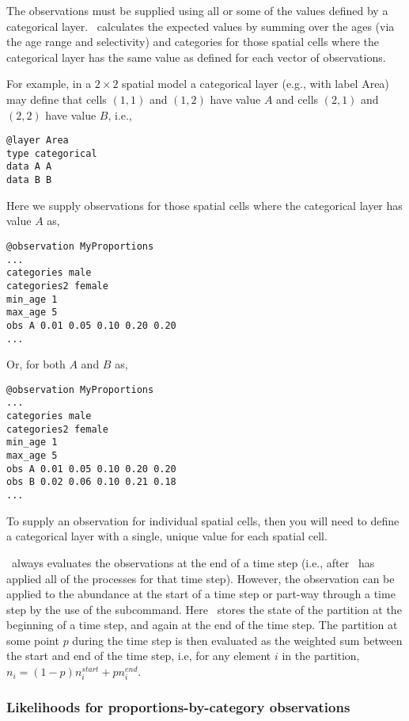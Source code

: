 The observations must be supplied using all or some of the values defined by a categorical layer. \SPM\ calculates the expected values by summing over the ages (via the age range and selectivity) and categories for those spatial cells where the categorical layer has the same value as defined for each vector of observations.

For example, in a $2 \times 2$ spatial model a categorical layer (e.g., with label Area) may define that cells $(1,1)$ and $(1,2)$ have value $A$ and cells $(2,1)$ and $(2,2)$ have value $B$, i.e.,

\begin{verbatim}
@layer Area
type categorical
data A A 
data B B
\end{verbatim}

Here we supply observations for those spatial cells where the categorical layer has value $A$ as, 

\begin{verbatim}
@observation MyProportions
...
categories male 
categories2 female
min_age 1
max_age 5
obs A 0.01 0.05 0.10 0.20 0.20
...
\end{verbatim}

Or, for both $A$ and $B$ as,

\begin{verbatim}
@observation MyProportions
...
categories male
categories2 female
min_age 1
max_age 5
obs A 0.01 0.05 0.10 0.20 0.20
obs B 0.02 0.06 0.10 0.21 0.18
...
\end{verbatim}

To supply an observation for individual spatial cells, then you will need to define a categorical layer with a single, unique value for each spatial cell. 

\SPM\ always evaluates the observations at the end of a time step (i.e., after \SPM\ has applied all of the processes for that time step). However, the observation can be applied to the abundance at the start of a time step or part-way through a time step by the use of the  subcommand. Here \SPM\ stores the state of the partition at the beginning of a time step, and again at the end of the time step. The partition at some point $p$ during the time step is then evaluated as the weighted sum between the start and end of the time step, i.e, for any element $i$ in the partition, $n_i=(1-p) n_i^{start} + p n_i^{end}$.

\subsubsection{Likelihoods for proportions-by-category observations}


